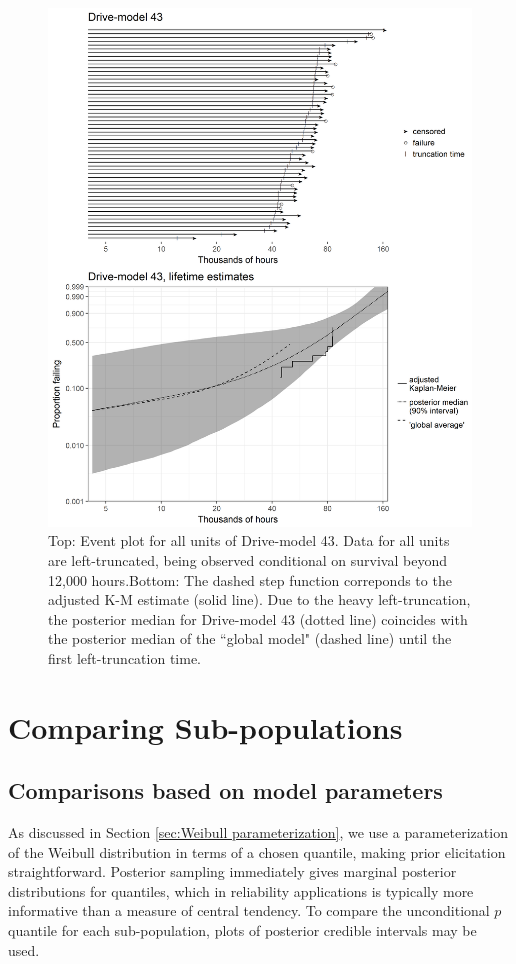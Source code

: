 \documentclass[12pt]{article}
\begin{document}
\begin{figure}
\centering
\includegraphics[height=.8\textheight]{dm43-shrinkage.png}
\caption{\footnotesize Top: Event plot for all units of Drive-model 43. Data for all units are left-truncated, being observed conditional on survival beyond 12,000 hours.\hspace{\textwidth}Bottom: The dashed step function correponds to the adjusted K-M estimate (solid line). Due to the heavy left-truncation, the posterior median for Drive-model 43 (dotted line) coincides with the posterior median of the ``global model" (dashed line) until the first left-truncation time.}
\label{fig:ex-mod-43}
\end{figure}

\section{Comparing Sub-populations}
\subsection{Comparisons based on model parameters}
As discussed in Section \ref{sec:Weibull parameterization}, we use a parameterization of the Weibull distribution in terms of a chosen quantile, making prior elicitation straightforward. Posterior sampling immediately gives marginal posterior distributions for quantiles, which in reliability applications is typically more informative than a measure of central tendency. To compare the unconditional $p$ quantile for each sub-population, plots of posterior credible intervals may be used.
\end{document}
